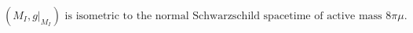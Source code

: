 $$(M_I, g|_{M_I}) \text{ is isometric to the normal Schwarzschild spacetime of active mass } 8\pi\mu.$$
